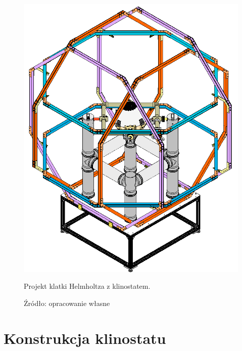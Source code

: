 \begin{figure}
	\centering
	\includegraphics[scale=0.3]{klinostat_klatka}
	\caption{Projekt klatki Helmholtza z klinostatem.} 
	\caption*{Źródło: opracowanie własne}
	\label{fig:klatka_helmholtza}
\end{figure}

\section{Konstrukcja klinostatu} \label{konstrukcja}

